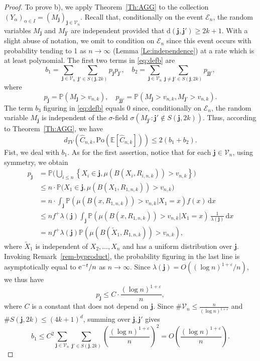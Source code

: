 \documentclass{article}
\theoremstyle{thm}
\theoremstyle{definition}
\theoremstyle{definition}
\theoremstyle{def}
\newcommand{\E}{\mathbb{E}} %
\newcommand{\PP}{\mathbb{P}} %
\newcommand{\jj}{\mathbf{j}}
\newcommand{\VV}{\mathcal{V}_n}
\begin{document}
\begin{proof}
To prove b), we apply Theorem~\ref{Th:AGG} to the collection $(Y_\alpha)_{\alpha\in I} = (M_{\jj})_{\jj\in \VV}$. Recall that, conditionally on the event $\mathcal{E}_n$,
the random variables $M_{\jj}$ and $M_{\jj'}$ are independent provided that d$(\jj,\jj')\geq 2k+1$. With a slight abuse of notation, we omit to condition on $\mathcal{E}_n$ since this event
occurs with probability tending to 1 as $n \to \infty$ (Lemma \ref{Le:independence}) at a rate which is at least polynomial. The first two terms in \eqref{eq:defb} are
\[
b_1=\sum_{\jj\in \VV} \sum_{\jj' \in S(\jj,2k)}p_\jj p_{\jj'}, \quad b_2=\sum_{\jj\in \VV}\sum_{\jj\neq \jj' \in S(\jj,2k)}p_{\jj\jj'}, \]
where
\[
p_{\jj}= \PP(M_\jj > v_{n,k}), \quad p_{\jj\jj'}=\PP(M_\jj>v_{n,k}, M_{\jj'}>v_{n,k}).
\]
The term $b_3$ figuring in \eqref{eq:defb} equals 0 since, conditionally on $\mathcal{E}_n$, the random variable $M_\jj$ is independent of the $\sigma$-field
$\sigma(M_{\jj'}: \jj'\not\in S(\jj,2k))$.  Thus, according to Theorem~\ref{Th:AGG}, we have
\[d_{TV}(\widehat{C}_{n,k}, \text{Po}({\E[\widehat{C}_{n,k}]}))\leq 2(b_1+b_2).\]
{Fist, we deal with $b_1$}. As for the first assertion, notice that for each $\jj\in \VV$, using symmetry, we obtain
\begin{align*}
p_\jj & = \PP \bigg(\bigcup_{i\leq n}\left\{X_i\in \jj, \mu(B(X_i,R_{i,n,k})) >v_{n,k}    \right\}\bigg) \\
& \leq n \cdot \PP \big( X_1\in \jj, \mu(B(X_1,R_{1,n,k})) >v_{n,k} \big)\\
& = n \cdot \int_{\jj} \PP(\mu(B(x,R_{1,n,k})) >v_{n,k}|X_1=x) f(x) \, \text{d} x\\
& \le n f^+ \lambda(\jj) \int_{\jj} \PP(\mu(B(x,R_{1,n,k})) >v_{n,k}|X_1=x)  \, \frac{1}{\lambda(\jj)} \, \text{d} x\\
& = n f^+ \lambda(\jj) \PP(\mu(B(\widetilde{X}_1,R_{1,n,k})) >v_{n,k}),
\end{align*}
where $\widetilde{X}_1$ is independent of $X_2,\ldots,X_n$ and has a uniform distribution   over $\jj$.
Invoking Remark~\ref{rem-byproduct}, the probability figuring in the last line is asymptotically equal to ${\rm e}^{-t}/n$ as $n \to \infty$.
Since  $\lambda(\jj)=O\left( (\log n)^{1+\varepsilon}/n\right)$, we thus have
\[
p_\jj \le C \cdot \frac{(\log n)^{1+ \varepsilon}}{n},
\]
where $C$ is a constant that does not depend on $\jj$.
 Since $\#\VV\leq \frac{n}{ (\log n)^{1+\varepsilon}}$ and $\#S(\jj, 2k)\leq (4k+1)^d$, summing over $\jj,\jj'$ gives
\[
b_1  \leq  C^2 \sum_{\jj\in \VV}\sum_{\jj'\in S(\jj,2k)}   \left( \frac{(\log n)^{1+\varepsilon}}{n}  \right)^2
 = O\left(  \frac{(\log n)^{1+\varepsilon}}{n} \right).
\]



\end{proof}
\end{document}
